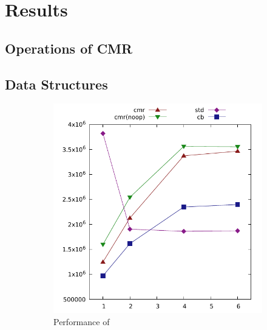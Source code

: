 \chapter{Results}
\lorem{}

\section{Operations of CMR}
\lorem{}

\section{Data Structures}
\lorem{}

\begin{figure}[ht]
\centering
  \begin{subfigure}{0.49\linewidth}
    \includegraphics[width=\linewidth]{graphs/lurifax-hm-insert.pdf}
    \caption{Performance of }
  \end{subfigure}
  \begin{subfigure}{0.49\linewidth}

\end{subfigure}
\end{figure}
